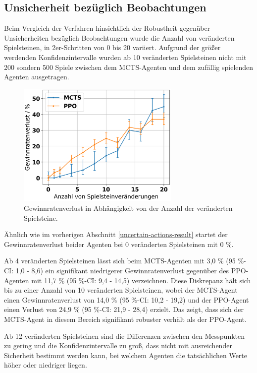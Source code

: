 \subsection{Unsicherheit bezüglich Beobachtungen}

Beim Vergleich der Verfahren hinsichtlich der Robustheit gegenüber Unsicherheiten bezüglich Beobachtungen wurde die Anzahl von veränderten Spielsteinen, in 2er-Schritten von 0 bis 20 variiert. Aufgrund der größer werdenden Konfidenzintervalle wurden ab 10 veränderten Spielsteinen nicht mit 200 sondern 500 Spiele zwischen dem MCTS-Agenten und dem zufällig spielenden Agenten ausgetragen.

\begin{figure}[ht!]%
	\includegraphics[width=0.7\textwidth, center]{Bilder/robustness-results/uncertain_observations_win_rate_losses.png}
	\caption{Gewinnratenverlust in Abhängigkeit von der Anzahl der veränderten Spielsteine.}
\end{figure}

Ähnlich wie im vorherigen Abschnitt \ref{uncertain-actions-result} startet der Gewinnratenverlust beider Agenten bei 0 veränderten Spielsteinen mit 0 \%.

Ab 4 veränderten Spielsteinen lässt sich beim MCTS-Agenten mit 3,0 \% (95 \%-CI: 1,0 - 8,6) ein signifikant niedrigerer Gewinnratenverlust gegenüber des PPO-Agenten mit 11,7 \% (95 \%-CI: 9,4 - 14,5) verzeichnen. Diese Diskrepanz hält sich bis zu einer Anzahl von 10 veränderten Spielsteinen, wobei der MCTS-Agent einen Gewinnratenverlust von 14,0 \% (95 \%-CI: 10,2 - 19,2) und der PPO-Agent einen Verlust von 24,9 \% (95 \%-CI: 21,9 - 28,4) erzielt. Das zeigt, dass sich der MCTS-Agent in diesem Bereich signifikant robuster verhält als der PPO-Agent.

Ab 12 veränderten Spielsteinen sind die Differenzen zwischen den Messpunkten zu gering und die Konfidenzintervalle zu groß, dass nicht mit ausreichender Sicherheit bestimmt werden kann, bei welchem Agenten die tatsächlichen Werte höher oder niedriger liegen.

